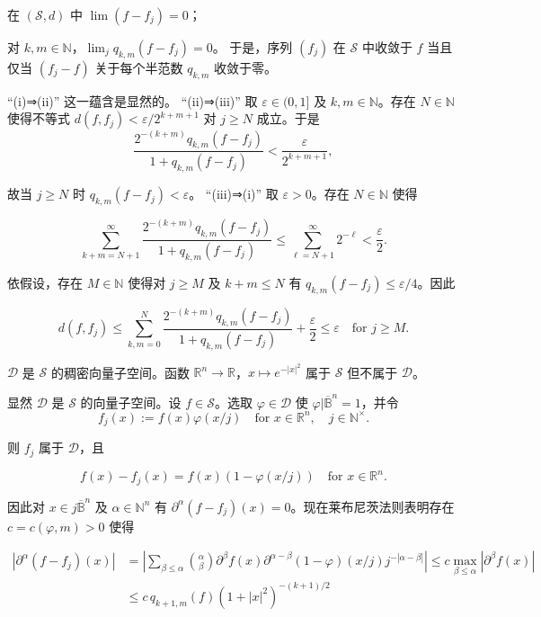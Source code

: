 \begin{remark}
\begin{items}
\begin{subitems}
在 $ (\mathcal{S},d) $ 中 $ \lim(f-f_j) = 0 $；

\item

对 $ k,m \in \mathbb{N} $，$ \lim_j q_{k,m}(f-f_j) = 0 $。
于是，序列 $ (f_j) $ 在 $ \mathcal{S} $ 中收敛于 $ f $ 当且仅当 $ (f_j - f) $ 关于每个半范数 $ q_{k,m} $ 收敛于零。

\proofhead
“(i)⇒(ii)” 这一蕴含是显然的。
“(ii)⇒(iii)” 取 $ \varepsilon \in (0,1] $ 及 $ k,m \in \mathbb{N} $。存在 $ N \in \mathbb{N} $ 使得不等式 $ d(f,f_j) < \varepsilon/2^{k+m+1} $ 对 $ j \ge N $ 成立。于是
\[
\frac{2^{-(k+m)}q_{k,m}(f-f_j)}{1+q_{k,m}(f-f_j)} < \frac{\varepsilon}{2^{k+m+1}} ,
\]

故当 $ j \ge N $ 时 $ q_{k,m}(f-f_j) < \varepsilon $。
“(iii)⇒(i)” 取 $ \varepsilon > 0 $。存在 $ N \in \mathbb{N} $ 使得

\[
\sum_{k+m=N+1}^{\infty}\frac{2^{-(k+m)}q_{k,m}(f-f_j)}{1+q_{k,m}(f-f_j)} \le \sum_{\ell=N+1}^{\infty} 2^{-\ell} < \frac{\varepsilon}{2} .
\]

依假设，存在 $ M \in \mathbb{N} $ 使得对 $ j \ge M $ 及 $ k+m \le N $ 有 $ q_{k,m}(f-f_j) \le \varepsilon/4 $。因此

\[
d(f,f_j) \le \sum_{k,m=0}^{N}\frac{2^{-(k+m)}q_{k,m}(f-f_j)}{1+q_{k,m}(f-f_j)} + \frac{\varepsilon}{2} \le \varepsilon \quad \text{for } j \ge M .
\]
\end{subitems}

\item

$ \mathcal{D} $ 是 $ \mathcal{S} $ 的稠密向量子空间。函数 $ \mathbb{R}^n \to \mathbb{R} $，$ x \mapsto e^{-|x|^2} $ 属于 $ \mathcal{S} $ 但不属于 $ \mathcal{D} $。

\proofhead
显然 $ \mathcal{D} $ 是 $ \mathcal{S} $ 的向量子空间。设 $ f \in \mathcal{S} $。选取 $ \varphi \in \mathcal{D} $ 使 $ \varphi | \overline{\mathbb{B}}^n = 1 $，并令
\[
f_j(x) := f(x)\varphi(x/j) \quad \text{for } x \in \mathbb{R}^n , \quad j \in \mathbb{N}^{\times} .
\]

则 $ f_j $ 属于 $ \mathcal{D} $，且

\[
f(x) - f_j(x) = f(x)(1-\varphi(x/j)) \quad \text{for } x \in \mathbb{R}^n .
\]

因此对 $ x \in j\overline{\mathbb{B}}^n $ 及 $ \alpha \in \mathbb{N}^n $ 有 $ \partial^{\alpha}(f-f_j)(x) = 0 $。现在莱布尼茨法则表明存在 $ c = c(\varphi,m) > 0 $ 使得

\begin{equation*}
\begin{aligned}
|\partial^{\alpha}(f-f_j)(x)| &= \left|\sum_{\beta \le \alpha}\binom{\alpha}{\beta}\partial^{\beta}f(x)\partial^{\alpha-\beta}(1-\varphi)(x/j)j^{-|\alpha-\beta|}\right| \le c\max_{\beta \le \alpha}|\partial^{\beta}f(x)| \\ &\le c\,q_{k+1,m}(f)(1+|x|^2)^{-(k+1)/2}
\end{aligned}
\end{equation*}


\end{items}
\end{remark}
